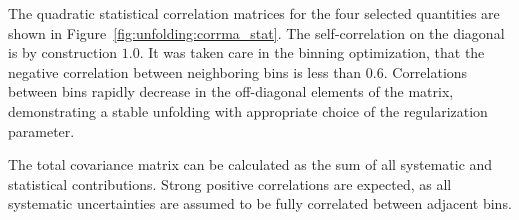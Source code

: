 The quadratic statistical correlation matrices for the four selected quantities are shown in Figure~\ref{fig:unfolding:corrma_stat}.
The self-correlation on the diagonal is by construction $1.0$.
It was taken care in the binning optimization, that the negative correlation between neighboring bins is 
less than $0.6$. Correlations between bins rapidly decrease in the off-diagonal elements of the matrix, demonstrating a stable unfolding with appropriate choice of the regularization parameter.

The total covariance matrix can be calculated as the sum of all systematic and statistical contributions. 
Strong positive correlations are expected, as all systematic uncertainties are assumed to be fully correlated between adjacent bins.



